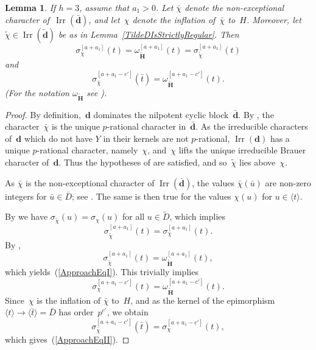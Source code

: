 \documentclass[12pt]{amsart}
\newcommand{\bH}{{\mathbf{H}}}
\newcommand{\bd}{{\mathbf{d}}}
\DeclareMathOperator{\Irr}{Irr}
\newtheorem{lem}[thm]{Lemma}
\theoremstyle{theorem}
\theoremstyle{definition}
\theoremstyle{remark}
\begin{document}
\begin{lem}
\label{Approach}
If $h = 3$, assume that $a_1 > 0$.
Let $\bar{\chi}$ denote the non-exceptional character of~$\Irr(\bar{\bd})$,
and let~$\chi$ denote the inflation of~$\bar{\chi}$ to~$H$. Moreover, let
$\tilde{\chi} \in \Irr( \tilde{\bd} )$ be as in 
{\rm Lemma~\ref{TildeDIsStrictlyRegular}}.
Then
\begin{equation}
\label{ApproachEqI}
\sigma_{\chi}^{[a+a_1]}( t ) =
\omega_{\tilde{\bH}}^{[a+a_1]}( t ) = \sigma_{\tilde{\chi}}^{[a+a_1]}( t )
\end{equation}
and
\begin{equation}
\label{ApproachEqII}
\sigma_{\bar{\chi}}^{[a+a_1-c']}( \bar{t} ) =
\omega_{\tilde{\bH}}^{[a+a_1-c']}( t ).
\end{equation}
(For the notation $\omega_{\tilde{\bH}}$ see \cite[Definition~$2.5.6$]{HL25}).
\end{lem}
\begin{proof}
By definition,~$\bd$ dominates the nilpotent cyclic block~$\bar{\bd}$. By 
\cite[Lemma $2.3.4$]{HL25},
the character~$\bar{\chi}$ is the unique $p$-rational character in~$\bar{\bd}$.
As the irreducible characters of~$\bd$ which do not have $Y$ in their kernels
are not $p$-rational, $\Irr( \bd )$ has a unique $p$-rational character,
namely~$\chi$, and~$\chi$ lifts the unique irreducible Brauer character 
of~$\bd$. Thus the hypotheses of \cite[Lemma $2.5.18$]{HL25} are satisfied, and 
so~$\tilde{\chi}$ lies above~$\chi$.

As $\bar{\chi}$ is the non-exceptional character of $\Irr(\bar{\bd})$, the
values $\bar{\chi}( \bar{u} )$ are non-zero integers for $\bar{u} \in \bar{D}$;
see \cite[Lemma~$3.3$]{HL24}. The same is then true for the values $\chi( u )$
for $u \in \langle t \rangle$.

By \cite[Lemma $2.5.18$]{HL25} we have
$\sigma_{\tilde{\chi}}( u ) = \sigma_{\chi}(u)$ for all $u \in \tilde{D}$, which
implies
$$\sigma_{\tilde{\chi}}^{[a+a_1]}( t ) = 
\sigma_{\chi}^{[a+a_1]}( t ).$$
By \cite[Lemma~$2.5.7$]{HL25},
$$\sigma_{\tilde{\chi}}^{[a+a_1]}( t ) = 
\omega_{\tilde{\bH}}^{[a+a_1]}( t ),$$
which yields~(\ref{ApproachEqI}). This trivially implies
$$\sigma_{\chi}^{[a+a_1 - c']}( t ) =
\omega_{\tilde{\bH}}^{[a+a_1 - c']}( t ).$$
Since~$\chi$ is the inflation of $\bar{\chi}$ to~$H$, and as the kernel
of the epimorphism $\langle t \rangle \rightarrow \langle \bar{t} \rangle 
= \bar{D}$ has order~$p^{c'}$, we obtain
$$\sigma_{\bar{\chi}}^{[a+a_1-c']}( \bar{t} ) = 
\sigma_{\chi}^{[a+a_1-c']}( t ),$$
which gives~(\ref{ApproachEqII}).
\end{proof}
\end{document}
